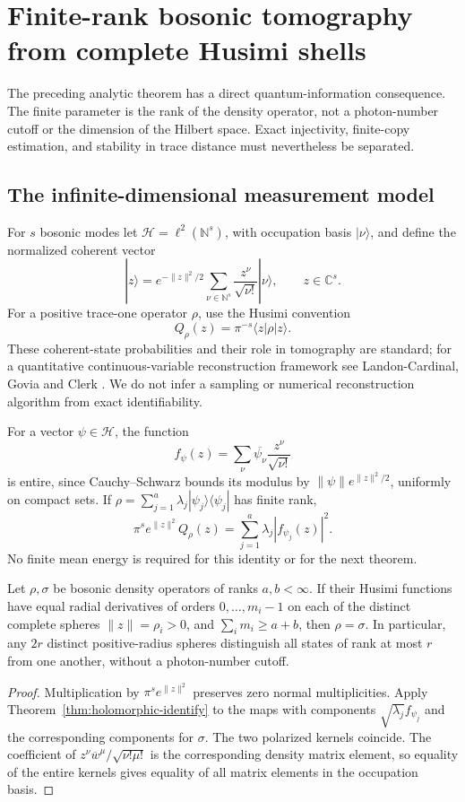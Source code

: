 \section{Finite-rank bosonic tomography from complete Husimi shells}
\label{sec:husimi-shell}
The preceding analytic theorem has a direct quantum-information consequence.
The finite parameter is the rank of the density operator, not a photon-number
cutoff or the dimension of the Hilbert space. Exact injectivity, finite-copy
estimation, and stability in trace distance must nevertheless be separated.

\subsection{The infinite-dimensional measurement model}
For $s$ bosonic modes let $\mathcal H=\ell^2(\mathbb N^s)$, with occupation
basis $|\nu\rangle$, and define the normalized coherent vector
\[
 |z\rangle=e^{-\|z\|^2/2}\sum_{\nu\in\mathbb N^s}
               \frac{z^\nu}{\sqrt{\nu!}}|\nu\rangle,
 \qquad z\in\mathbb C^s.
\]
For a positive trace-one operator $\rho$, use the Husimi convention
\[
 Q_\rho(z)=\pi^{-s}\langle z|\rho|z\rangle.
\]
These coherent-state probabilities and their role in tomography are standard;
for a quantitative continuous-variable reconstruction framework see
Landon-Cardinal, Govia and Clerk \cite{LGC2018}. We do not infer a sampling
or numerical reconstruction algorithm from exact identifiability.

For a vector $\psi\in\mathcal H$, the function
\[
 f_\psi(z)=\sum_\nu\overline{\psi_\nu}\frac{z^\nu}{\sqrt{\nu!}}
\]
is entire, since Cauchy--Schwarz bounds its modulus by
$\|\psi\|e^{\|z\|^2/2}$, uniformly on compact sets. If
$\rho=\sum_{j=1}^a\lambda_j|\psi_j\rangle\langle\psi_j|$ has finite rank,
\[
 \pi^s e^{\|z\|^2}Q_\rho(z)
             =\sum_{j=1}^a\lambda_j|f_{\psi_j}(z)|^2.
 \tag{H.1}\label{eq:husimi-bargmann}
\]
No finite mean energy is required for this identity or for the next theorem.

\begin{theorem}\label{thm:husimi-shell}
Let $\rho,\sigma$ be bosonic density operators of ranks $a,b<\infty$.
If their Husimi functions have equal radial derivatives of orders
$0,\ldots,m_i-1$ on each of the distinct complete spheres $\|z\|=\rho_i>0$, and
$\sum_i m_i\ge a+b$, then $\rho=\sigma$.
In particular, any $2r$ distinct positive-radius spheres distinguish all
states of rank at most $r$ from one another, without a photon-number cutoff.
\end{theorem}
\begin{proof}
Multiplication by $\pi^s e^{\|z\|^2}$ preserves zero normal multiplicities.
Apply Theorem~\ref{thm:holomorphic-identify} to the maps with components
$\sqrt{\lambda_j}f_{\psi_j}$ and the corresponding components for $\sigma$.
The two polarized kernels coincide. The coefficient of
$z^\nu\overline w^{\mu}/\sqrt{\nu!\mu!}$ is the corresponding density
matrix element, so equality of the entire kernels gives equality of all
matrix elements in the occupation basis.
\end{proof}

